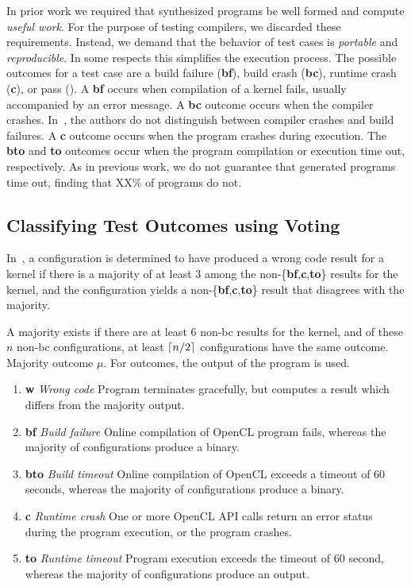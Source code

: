 In prior work we required that synthesized programs be well formed and compute \emph{useful work}. For the purpose of testing compilers, we discarded these requirements. Instead, we demand that the behavior of test cases is \emph{portable} and \emph{reproducible}. In some respects this simplifies the execution process. The possible outcomes for a test case are a build failure (\textbf{bf}), build crash (\textbf{bc}), runtime crash (\textbf{c}), or pass (\textbf{\cmark}). A \textbf{bf} occurs when compilation of a kernel fails, usually accompanied by an error message. A \textbf{bc} outcome occurs when the compiler crashes. In~\cite{Lidbury2015a}, the authors do not distinguish between compiler crashes and build failures. A \textbf{c} outcome occurs when the program crashes during execution. The \textbf{bto} and \textbf{to} outcomes occur when the program compilation or execution time out, respectively. As in previous work, we do not guarantee that generated programs time out, finding that XX\% of programs do not.


\subsection{Classifying Test Outcomes using Voting}

In~\cite{Lidbury2015a}, a configuration is determined to have produced a wrong code result for a kernel if there is a majority of at least 3 among the non-\{\textbf{bf},\textbf{c},\textbf{to}\} results for the kernel, and the configuration yields a non-\{\textbf{bf},\textbf{c},\textbf{to}\} result that disagrees with the majority.

A majority exists if there are at least 6 non-bc results for the kernel, and of these $n$ non-bc configurations, at least $\lceil n/2\rceil$ configurations have the same outcome. Majority outcome $\mu$. For \cmark outcomes, the output of the program is used.

%
\begin{enumerate}
	\item \textbf{w} \emph{Wrong code} Program terminates gracefully, but computes a result which differs from the majority output.
	\item \textbf{bf} \emph{Build failure} Online compilation of OpenCL program fails, whereas the majority of configurations produce a binary.
	\item \textbf{bto} \emph{Build timeout} Online compilation of OpenCL exceeds a timeout of 60 seconds, whereas the majority of configurations produce a binary.
	\item \textbf{c} \emph{Runtime crash} One or more OpenCL API calls return an error status during the program execution, or the program crashes.
	\item \textbf{to} \emph{Runtime timeout} Program execution exceeds the timeout of 60 second, whereas the majority of configurations produce an output.
\end{enumerate}


